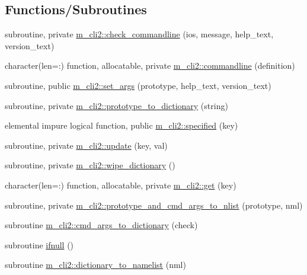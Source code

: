 \subsection*{Functions/\+Subroutines}
\begin{DoxyCompactItemize}
\item 
subroutine, private \mbox{\hyperlink{namespacem__cli2_a02d4639b325d1b8c6fd3b03ba515f2b3}{m\+\_\+cli2\+::check\+\_\+commandline}} (ios, message, help\+\_\+text, version\+\_\+text)
\item 
character(len=\+:) function, allocatable, private \mbox{\hyperlink{namespacem__cli2_a85c38a938a7dd9a749daf8effe45c109}{m\+\_\+cli2\+::commandline}} (definition)
\item 
subroutine, public \mbox{\hyperlink{namespacem__cli2_a6d20994aa80217dd3d0ffd1d5586f736}{m\+\_\+cli2\+::set\+\_\+args}} (prototype, help\+\_\+text, version\+\_\+text)
\item 
subroutine, private \mbox{\hyperlink{namespacem__cli2_a14896d00e509cbc32f4df993a8d6f75b}{m\+\_\+cli2\+::prototype\+\_\+to\+\_\+dictionary}} (string)
\item 
elemental impure logical function, public \mbox{\hyperlink{namespacem__cli2_a90118f308a5120041a5862fca4740367}{m\+\_\+cli2\+::specified}} (key)
\item 
subroutine, private \mbox{\hyperlink{namespacem__cli2_a160d56bc4a10faef7e8a8a4f04f4dadb}{m\+\_\+cli2\+::update}} (key, val)
\item 
subroutine, private \mbox{\hyperlink{namespacem__cli2_ab1525b0419475486f520ef502daa5e94}{m\+\_\+cli2\+::wipe\+\_\+dictionary}} ()
\item 
character(len=\+:) function, allocatable, private \mbox{\hyperlink{namespacem__cli2_aa92e8ad0300d4e324e29eae1ab9d04b4}{m\+\_\+cli2\+::get}} (key)
\item 
subroutine, private \mbox{\hyperlink{namespacem__cli2_a46f31858773ff1b4cf96329a14130bf2}{m\+\_\+cli2\+::prototype\+\_\+and\+\_\+cmd\+\_\+args\+\_\+to\+\_\+nlist}} (prototype, nml)
\item 
subroutine \mbox{\hyperlink{namespacem__cli2_a3348b0c76dadd62c536e06f82bcb0331}{m\+\_\+cli2\+::cmd\+\_\+args\+\_\+to\+\_\+dictionary}} (check)
\item 
subroutine \mbox{\hyperlink{M__CLI2_8f90_aa26f90016621d1ee43d3b5b66316532b}{ifnull}} ()
\item 
subroutine \mbox{\hyperlink{namespacem__cli2_ab43e4e37723a0acc2183fbbf3d8c36bd}{m\+\_\+cli2\+::dictionary\+\_\+to\+\_\+namelist}} (nml)
\item 

\end{DoxyCompactItemize}
